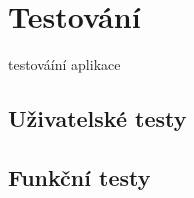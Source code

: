 
\chapter{Testování}
        testováíní aplikace
    \section{Uživatelské testy}
        
    \section{Funkční testy}
